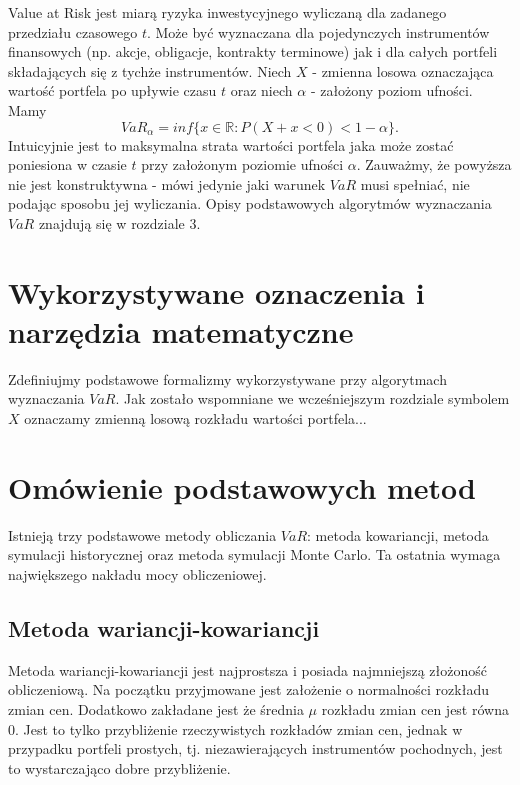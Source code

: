 \documentclass[11pt,titlepage]{article}
\begin{document}
Value at Risk jest miarą ryzyka inwestycyjnego wyliczaną dla zadanego przedziału czasowego $t$. Może być wyznaczana dla pojedynczych instrumentów finansowych (np. akcje, obligacje, kontrakty terminowe) jak i dla całych portfeli składających się z tychże instrumentów. Niech $X$ - zmienna losowa oznaczająca wartość portfela po upływie czasu $t$ oraz niech $\alpha$ - założony poziom ufności. Mamy
$$VaR_{\alpha}=inf\{ x\in \mathbb{R}:P(X+x<0) <  1-\alpha \}.$$
Intuicyjnie jest to maksymalna strata wartości portfela jaka może zostać poniesiona w czasie $t$ przy założonym poziomie ufności $\alpha$. Zauważmy, że powyższa nie jest konstruktywna - mówi jedynie jaki warunek $VaR$ musi spełniać, nie podając sposobu jej wyliczania. Opisy podstawowych algorytmów wyznaczania $VaR$ znajdują się w rozdziale 3.



\section{Wykorzystywane oznaczenia i narzędzia matematyczne}
Zdefiniujmy podstawowe formalizmy wykorzystywane przy algorytmach wyznaczania $VaR$. Jak zostało wspomniane we wcześniejszym rozdziale symbolem $X$ oznaczamy zmienną losową rozkładu wartości portfela...


\section{Omówienie podstawowych metod}
Istnieją trzy podstawowe metody obliczania $VaR$: metoda kowariancji, metoda symulacji historycznej oraz metoda symulacji Monte Carlo. Ta ostatnia wymaga największego nakładu mocy obliczeniowej.

\newpage







\subsection{Metoda wariancji-kowariancji}


Metoda wariancji-kowariancji jest najprostsza i posiada najmniejszą złożoność obliczeniową. Na początku przyjmowane jest założenie o normalności rozkładu zmian cen. Dodatkowo zakładane jest że średnia $\mu$ rozkładu zmian cen jest równa 0. Jest to tylko przybliżenie rzeczywistych rozkładów zmian cen, jednak w przypadku portfeli prostych, tj. niezawierających instrumentów pochodnych, jest to wystarczająco dobre przybliżenie. 
\end{document}
